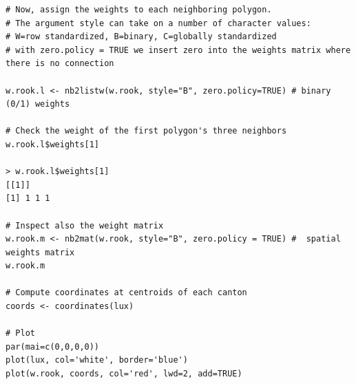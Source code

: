 \documentclass[12pt]{beamer}
\begin{document}
\begin{frame} [fragile]
\begin{tiny}
\begin{verbatim}
# Now, assign the weights to each neighboring polygon.
# The argument style can take on a number of character values:
# W=row standardized, B=binary, C=globally standardized
# with zero.policy = TRUE we insert zero into the weights matrix where there is no connection

w.rook.l <- nb2listw(w.rook, style="B", zero.policy=TRUE) # binary (0/1) weights

# Check the weight of the first polygon's three neighbors
w.rook.l$weights[1]

> w.rook.l$weights[1]
[[1]]
[1] 1 1 1

# Inspect also the weight matrix
w.rook.m <- nb2mat(w.rook, style="B", zero.policy = TRUE) #  spatial weights matrix
w.rook.m

# Compute coordinates at centroids of each canton
coords <- coordinates(lux)

# Plot
par(mai=c(0,0,0,0))
plot(lux, col='white', border='blue')
plot(w.rook, coords, col='red', lwd=2, add=TRUE)

\end{verbatim}
\end{tiny}
\end{frame}
\end{document}
